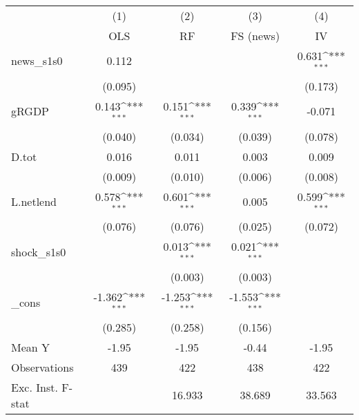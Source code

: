 {
\def\sym#1{\ifmmode^{#1}\else\(^{#1}\)\fi}
\begin{tabular}{l*{4}{c}}
\toprule
            &\multicolumn{1}{c}{(1)}&\multicolumn{1}{c}{(2)}&\multicolumn{1}{c}{(3)}&\multicolumn{1}{c}{(4)}\\
            &\multicolumn{1}{c}{OLS}&\multicolumn{1}{c}{RF}&\multicolumn{1}{c}{FS (news)}&\multicolumn{1}{c}{IV}\\
\midrule
news\_s1s0   &       0.112         &                     &                     &       0.631\sym{***}\\
            &     (0.095)         &                     &                     &     (0.173)         \\
\addlinespace
gRGDP       &       0.143\sym{***}&       0.151\sym{***}&       0.339\sym{***}&      -0.071         \\
            &     (0.040)         &     (0.034)         &     (0.039)         &     (0.078)         \\
\addlinespace
D.tot       &       0.016         &       0.011         &       0.003         &       0.009         \\
            &     (0.009)         &     (0.010)         &     (0.006)         &     (0.008)         \\
\addlinespace
L.netlend   &       0.578\sym{***}&       0.601\sym{***}&       0.005         &       0.599\sym{***}\\
            &     (0.076)         &     (0.076)         &     (0.025)         &     (0.072)         \\
\addlinespace
shock\_s1s0  &                     &       0.013\sym{***}&       0.021\sym{***}&                     \\
            &                     &     (0.003)         &     (0.003)         &                     \\
\addlinespace
\_cons      &      -1.362\sym{***}&      -1.253\sym{***}&      -1.553\sym{***}&                     \\
            &     (0.285)         &     (0.258)         &     (0.156)         &                     \\
\midrule
Mean Y      &       -1.95         &       -1.95         &       -0.44         &       -1.95         \\
Observations&         439         &         422         &         438         &         422         \\
Exc. Inst. F-stat&                     &      16.933         &      38.689         &      33.563         \\
\bottomrule
\end{tabular}
}
